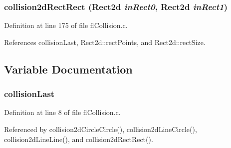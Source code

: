 \subsubsection{ collision2d\-Rect\-Rect ({\bf Rect2d} {\em in\-Rect0}, {\bf Rect2d} {\em in\-Rect1})}\label{flCollision_8h_0bc28bfeb7982182d0168423a6ae8b9c}




Definition at line 175 of file fl\-Collision.c.

References collision\-Last, Rect2d::rect\-Points, and Rect2d::rect\-Size.

\subsection{Variable Documentation}
\subsubsection{ {\bf collision\-Last}}\label{flCollision_8h_bd00ab8c248da82912ff1a8ca676cf86}




Definition at line 8 of file fl\-Collision.c.

Referenced by collision2d\-Circle\-Circle(), collision2d\-Line\-Circle(), collision2d\-Line\-Line(), and collision2d\-Rect\-Rect().